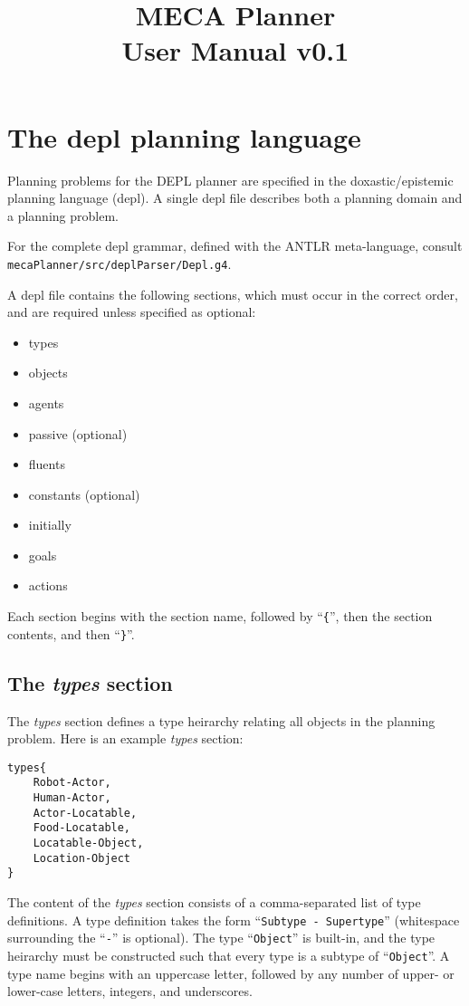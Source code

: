\documentclass{article}
\title{MECA Planner  \\
\large User Manual v0.1
}
\begin{document}
\maketitle

\section{The depl planning language}

Planning problems for the DEPL planner are specified in the doxastic/epistemic
planning language (depl). A single depl file describes both a planning domain
and a planning problem.

For the complete depl grammar, defined with the ANTLR meta-language, consult
\texttt{mecaPlanner/src/deplParser/Depl.g4}.


A depl file contains the following sections, which must occur in the correct
order, and are required unless specified as optional:

\begin{itemize}
\item types
\item objects
\item agents
\item passive (optional)
\item fluents
\item constants (optional)
\item initially
\item goals
\item actions
\end{itemize}

\noindent
Each section begins with the section name, followed by
``\verb|{|'', 
then the section contents, and then
``\verb|}|''. 


\subsection{The \emph{types} section}

The \emph{types} section defines a type heirarchy relating all objects in the planning
problem.
Here is an example \emph{types} section:
\begin{verbatim}
types{
    Robot-Actor,
    Human-Actor,
    Actor-Locatable,
    Food-Locatable,
    Locatable-Object,
    Location-Object
}
\end{verbatim}

The content of the \emph{types} section consists of a comma-separated list of
type definitions. A type definition takes the form
``\texttt{Subtype - Supertype}'' (whitespace surrounding the ``\texttt{-}'' is
optional). The type ``\texttt{Object}'' is built-in, and
the type heirarchy must be constructed such that every type is a subtype of
``\texttt{Object}''.  A type name begins with an uppercase letter, followed
by any number of upper- or lower-case letters, integers, and underscores.
\end{document}
